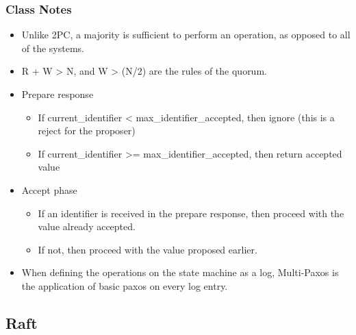 \documentclass[a4paper]{article}
\begin{document}
\subsubsection{Class Notes}

\begin{itemize}
\item
    Unlike 2PC, a majority is sufficient to perform an operation, as
    opposed to all of the systems.
\item
    R + W \textgreater{} N, and W \textgreater{} (N/2) are the rules of
    the quorum.
\item
    Prepare response

    \begin{itemize}
        \item
        If current\_identifier \textless{} max\_identifier\_accepted, then
        ignore (this is a reject for the proposer)
    \item
        If current\_identifier \textgreater{}= max\_identifier\_accepted,
        then return accepted value
    \end{itemize}
\item
    Accept phase

    \begin{itemize}
        \item
        If an identifier is received in the prepare response, then proceed
        with the value already accepted.
    \item
        If not, then proceed with the value proposed earlier.
    \end{itemize}
\item
    When defining the operations on the state machine as a log,
    Multi-Paxos is the application of basic paxos on every log entry.
\end{itemize}

\subsection{Raft}
\end{document}
